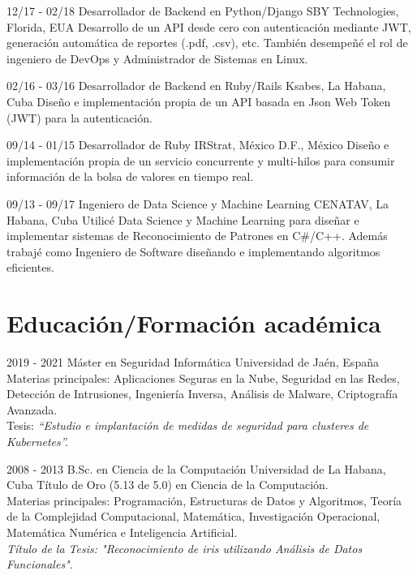 \documentclass[]{friggeri-cv}
\begin{document}
\begin{entrylist}
  \entry
    {12/17 - 02/18}
    {Desarrollador de Backend en Python/Django}
    {SBY Technologies, Florida, EUA}
    {Desarrollo de un API desde cero con autenticación mediante JWT, generación automática de reportes (.pdf, .csv), etc. También desempeñé el rol de ingeniero de DevOps y Administrador de Sistemas en Linux.\\}
    
  \entry
    {02/16 - 03/16}
    {Desarrollador de Backend en Ruby/Rails}
    {Ksabes, La Habana, Cuba}
    {Diseño e implementación propia de un API basada en Json Web Token (JWT) para la autenticación.\\}

  \entry
    {09/14 - 01/15}
    {Desarrollador de Ruby}
    {IRStrat, México D.F., México}
    {Diseño e implementación propia de un servicio concurrente y multi-hilos para consumir información de la bolsa de valores en tiempo real.\\}

  \entry
    {09/13 - 09/17}
    {Ingeniero de Data Science y Machine Learning}
    {CENATAV, La Habana, Cuba}
    {Utilicé Data Science y Machine Learning para diseñar e implementar sistemas de Reconocimiento de Patrones en C\#/C++. Además trabajé como Ingeniero de Software diseñando e implementando algoritmos eficientes.\\}    
    
\end{entrylist}

\pagebreak

\section{Educación/Formación académica}
\begin{entrylist}
  \entry
    {2019 - 2021}
    {Máster en Seguridad Informática}
    {Universidad de Jaén, España}
    {
    	Materias principales: Aplicaciones Seguras en la Nube, Seguridad en las Redes, Detección de Intrusiones, Ingeniería Inversa, Análisis de Malware, Criptografía Avanzada.\\
    	Tesis: \emph{``Estudio e implantación de medidas de seguridad para clusteres de Kubernetes''.}\\
    }

  \entry
    {2008 - 2013}
    {B.Sc. en Ciencia de la Computación}
    {Universidad de La Habana, Cuba}
    {Título de Oro (5.13 de 5.0) en Ciencia de la Computación.\\ Materias principales: Programación, Estructuras de Datos y Algoritmos, Teoría de la Complejidad Computacional, Matemática, Investigación Operacional, Matemática Numérica e Inteligencia Artificial.\\
    \emph{Título de la Tesis: "Reconocimiento de iris utilizando Análisis de Datos Funcionales".}}

\end{entrylist}
\end{document}
